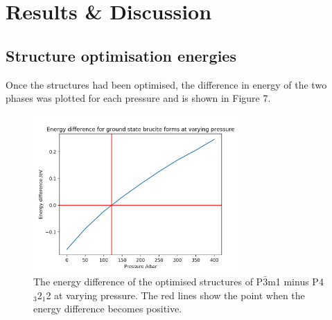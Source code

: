 \documentclass[a4paper,12pt]{article}
\begin{document}
\section{Results \& Discussion}
%
% 
%

\subsection{Structure optimisation energies}

Once the structures had been optimised, the difference in energy of the two phases was plotted for each pressure and is shown in Figure 7.

\begin{figure}[h!!!!!]
	\centering
	\includegraphics[width=8cm]{figures/ediff_GS_pvary_ex.png}
	\caption{The energy difference of the optimised structures of P$\bar3$m1 minus P4$_3$2$_1$2 at varying pressure. The red lines show the point when the energy difference becomes positive.}
	\label{Fig7}
\end{figure}
\end{document}
